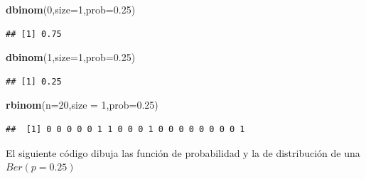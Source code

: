 \documentclass[]{book}
\newenvironment{Shaded}{\begin{snugshade}}{\end{snugshade}}
\newcommand{\DataTypeTok}[1]{\textcolor[rgb]{0.13,0.29,0.53}{#1}}
\newcommand{\DecValTok}[1]{\textcolor[rgb]{0.00,0.00,0.81}{#1}}
\newcommand{\FloatTok}[1]{\textcolor[rgb]{0.00,0.00,0.81}{#1}}
\newcommand{\KeywordTok}[1]{\textcolor[rgb]{0.13,0.29,0.53}{\textbf{#1}}}
\newcommand{\NormalTok}[1]{#1}
\begin{document}
\begin{Shaded}
\begin{Highlighting}[]
\KeywordTok{dbinom}\NormalTok{(}\DecValTok{0}\NormalTok{,}\DataTypeTok{size=}\DecValTok{1}\NormalTok{,}\DataTypeTok{prob=}\FloatTok{0.25}\NormalTok{)}
\end{Highlighting}
\end{Shaded}

\begin{verbatim}
## [1] 0.75
\end{verbatim}

\begin{Shaded}
\begin{Highlighting}[]
\KeywordTok{dbinom}\NormalTok{(}\DecValTok{1}\NormalTok{,}\DataTypeTok{size=}\DecValTok{1}\NormalTok{,}\DataTypeTok{prob=}\FloatTok{0.25}\NormalTok{)}
\end{Highlighting}
\end{Shaded}

\begin{verbatim}
## [1] 0.25
\end{verbatim}

\begin{Shaded}
\begin{Highlighting}[]
\KeywordTok{rbinom}\NormalTok{(}\DataTypeTok{n=}\DecValTok{20}\NormalTok{,}\DataTypeTok{size =} \DecValTok{1}\NormalTok{,}\DataTypeTok{prob=}\FloatTok{0.25}\NormalTok{)}
\end{Highlighting}
\end{Shaded}

\begin{verbatim}
##  [1] 0 0 0 0 0 1 1 0 0 0 1 0 0 0 0 0 0 0 0 1
\end{verbatim}

El siguiente código dibuja las función de probabilidad y la de distribución de una \(Ber(p=0.25)\)
\end{document}
